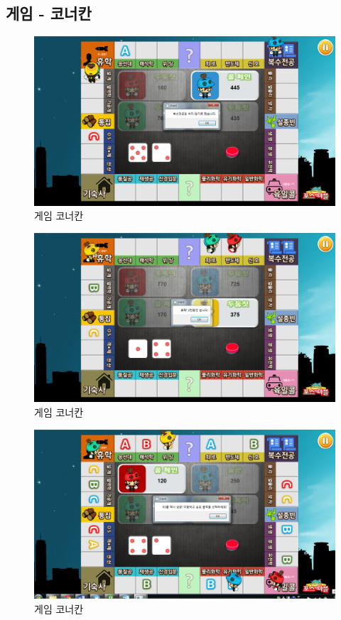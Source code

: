 \documentclass[10pt,oneside,a4paper,titlepage]{article}
\begin{document}
\subsection{게임 - 코너칸}
\begin{figure}[H]
\centering
\centerline{\includegraphics[scale=0.65]{images/8corner1}}
\caption{게임 코너칸}
\end{figure}
\begin{figure}[H]
\centering
\centerline{\includegraphics[scale=0.65]{images/8corner2}}
\caption{게임 코너칸}
\end{figure}
\begin{figure}[H]
\centering
\centerline{\includegraphics[scale=0.65]{images/8corner3}}
\caption{게임 코너칸}
\end{figure}
\end{document}
